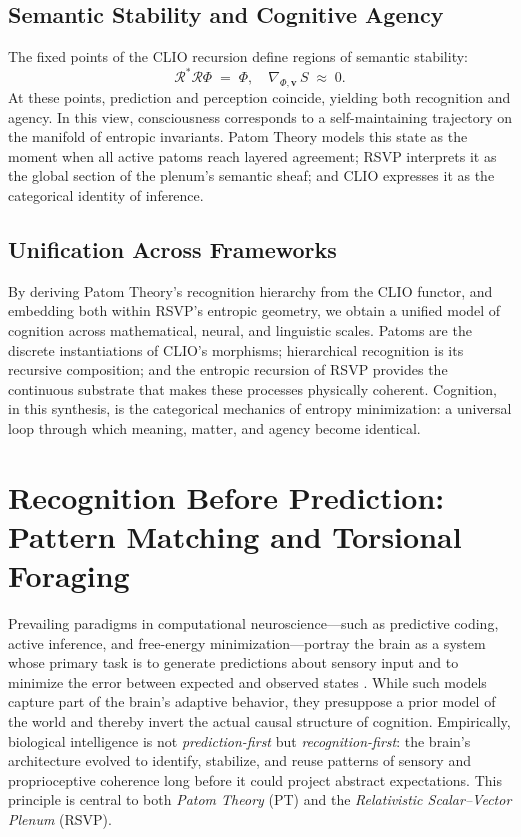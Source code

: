 \documentclass[11pt]{article}
\begin{document}
\subsection{Semantic Stability and Cognitive Agency}
The fixed points of the CLIO recursion define regions of semantic stability:
\[
\mathcal{R}^{\ast}\mathcal{R}\Phi \;=\; \Phi,
\quad
\nabla_{\!\Phi,\mathbf{v}}\,S \;\approx\; 0.
\]
At these points, prediction and perception coincide, yielding both recognition and agency. In this view, consciousness corresponds to a self-maintaining trajectory on the manifold of entropic invariants. Patom Theory models this state as the moment when all active patoms reach layered agreement; RSVP interprets it as the global section of the plenum’s semantic sheaf; and CLIO expresses it as the categorical identity of inference.

\subsection{Unification Across Frameworks}
By deriving Patom Theory’s recognition hierarchy from the CLIO functor, and embedding both within RSVP’s entropic geometry, we obtain a unified model of cognition across mathematical, neural, and linguistic scales. Patoms are the discrete instantiations of CLIO’s morphisms; hierarchical recognition is its recursive composition; and the entropic recursion of RSVP provides the continuous substrate that makes these processes physically coherent. Cognition, in this synthesis, is the categorical mechanics of entropy minimization: a universal loop through which meaning, matter, and agency become identical.

\section{Recognition Before Prediction: Pattern Matching and Torsional Foraging}
Prevailing paradigms in computational neuroscience---such as predictive coding, active inference, and free-energy minimization---portray the brain as a system whose primary task is to generate predictions about sensory input and to minimize the error between expected and observed states \citep{clark2013whatever, friston2010free}. While such models capture part of the brain's adaptive behavior, they presuppose a prior model of the world and thereby invert the actual causal structure of cognition. Empirically, biological intelligence is not \emph{prediction-first} but \emph{recognition-first}: the brain’s architecture evolved to identify, stabilize, and reuse patterns of sensory and proprioceptive coherence long before it could project abstract expectations. This principle is central to both \textit{Patom Theory} (PT) and the \textit{Relativistic Scalar--Vector Plenum} (RSVP).
\end{document}
